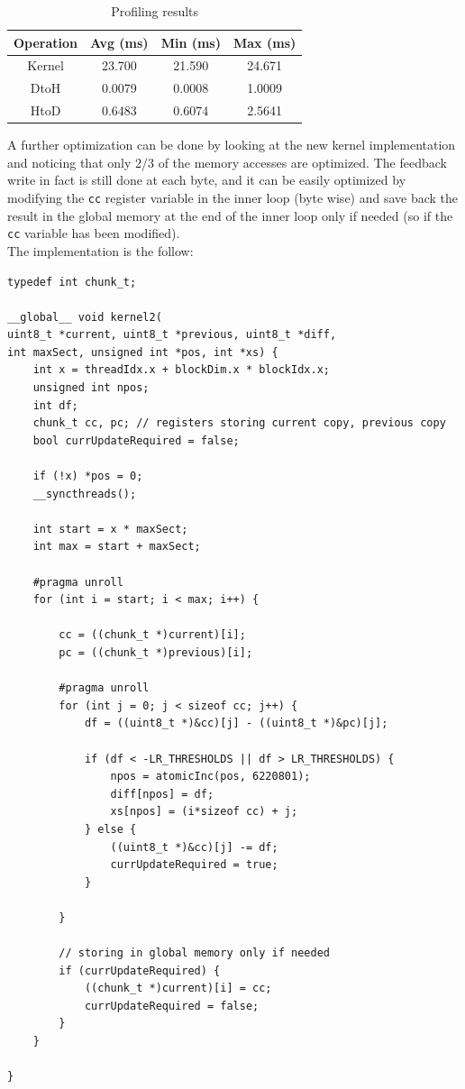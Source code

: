 \documentclass[paper=a4, fontsize=10pt]{scrartcl}	%
\begin{document}
	\begin{table}[H]
		\centering
		\begin{tabular}{||c | c c c||} 
			\hline
			Operation & Avg (ms) & Min (ms) & Max (ms) \\ [0.5ex] 
			\hline\hline
			Kernel & 23.700 & 21.590 & 24.671 \\ 
			\hdashline
			DtoH & 0.0079 & 0.0008 & 1.0009 \\
			\hdashline
			HtoD & 0.6483 & 0.6074 & 2.5641 \\
			\hline
		\end{tabular}
		\caption{Profiling results}
		\label{tab:nvprof_naif4}
	\end{table}

	A further optimization can be done by looking at the new kernel implementation and noticing that only 2/3 of the memory accesses are optimized. The feedback write in fact is still done at each byte, and it can be easily optimized by modifying the \texttt{cc} register variable in the inner loop (byte wise) and save back the result in the global memory at the end of the inner loop only if needed (so if the \texttt{cc} variable has been modified).\\
	
	The implementation is the follow:

	\begin{lstlisting}[style=CStyle]
typedef int chunk_t;

__global__ void kernel2(
uint8_t *current, uint8_t *previous, uint8_t *diff, 
int maxSect, unsigned int *pos, int *xs) {
    int x = threadIdx.x + blockDim.x * blockIdx.x;
    unsigned int npos;
    int df;
    chunk_t cc, pc; // registers storing current copy, previous copy
    bool currUpdateRequired = false;

    if (!x) *pos = 0;
    __syncthreads();

    int start = x * maxSect;
    int max = start + maxSect;

    #pragma unroll
    for (int i = start; i < max; i++) {

        cc = ((chunk_t *)current)[i];
        pc = ((chunk_t *)previous)[i];

        #pragma unroll
        for (int j = 0; j < sizeof cc; j++) {
            df = ((uint8_t *)&cc)[j] - ((uint8_t *)&pc)[j];

            if (df < -LR_THRESHOLDS || df > LR_THRESHOLDS) {
                npos = atomicInc(pos, 6220801);
                diff[npos] = df;
                xs[npos] = (i*sizeof cc) + j;
            } else {
                ((uint8_t *)&cc)[j] -= df;
                currUpdateRequired = true;
            }

        }

        // storing in global memory only if needed
        if (currUpdateRequired) {
        	((chunk_t *)current)[i] = cc;
        	currUpdateRequired = false;
        }
    }

}
	\end{lstlisting}
\end{document}
